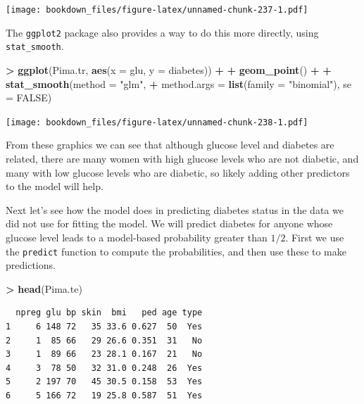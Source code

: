 \documentclass[]{krantz}
\makeatletter
\newenvironment{Shaded}{\begin{snugshade}}{\end{snugshade}}
\newcommand{\KeywordTok}[1]{\textcolor[rgb]{0.27,0.27,0.27}{\textbf{#1}}}
\newcommand{\DataTypeTok}[1]{\textcolor[rgb]{0.27,0.27,0.27}{#1}}
\newcommand{\StringTok}[1]{\textcolor[rgb]{0.5,0.5,0.5}{#1}}
\newcommand{\OtherTok}[1]{\textcolor[rgb]{0.37,0.37,0.37}{#1}}
\newcommand{\OperatorTok}[1]{\textcolor[rgb]{0.43,0.43,0.43}{\textbf{#1}}}
\newcommand{\NormalTok}[1]{#1}
\newenvironment{kframe}{%
\medskip{}
\setlength{\fboxsep}{.8em}
 \def\at@end@of@kframe{}%
 \ifinner\ifhmode%
  \def\at@end@of@kframe{\end{minipage}}%
  \begin{minipage}{\columnwidth}%
 \fi\fi%
 \def\FrameCommand##1{\hskip\@totalleftmargin \hskip-\fboxsep
 \colorbox{shadecolor}{##1}\hskip-\fboxsep
     \hskip-\linewidth \hskip-\@totalleftmargin \hskip\columnwidth}%
 \MakeFramed {\advance\hsize-\width
   \@totalleftmargin\z@ \linewidth\hsize
   \@setminipage}}%
 {\par\unskip\endMakeFramed%
 \at@end@of@kframe}
\renewenvironment{Shaded}{\begin{kframe}}{\end{kframe}}
\makeatother
\begin{document}
\texttt{[image: bookdown\_files/figure-latex/unnamed-chunk-237-1.pdf]}

The \texttt{ggplot2} package also provides a way to do this more
directly, using \texttt{stat\_smooth}.

\begin{Shaded}
\begin{Highlighting}[]
\OperatorTok{>}\StringTok{ }\KeywordTok{ggplot}\NormalTok{(Pima.tr, }\KeywordTok{aes}\NormalTok{(}\DataTypeTok{x =}\NormalTok{ glu, }\DataTypeTok{y =}\NormalTok{ diabetes)) }\OperatorTok{+}\StringTok{ }
\OperatorTok{+}\StringTok{   }\KeywordTok{geom_point}\NormalTok{() }\OperatorTok{+}\StringTok{ }
\OperatorTok{+}\StringTok{   }\KeywordTok{stat_smooth}\NormalTok{(}\DataTypeTok{method =} \StringTok{"glm"}\NormalTok{, }
\OperatorTok{+}\StringTok{               }\DataTypeTok{method.args =} \KeywordTok{list}\NormalTok{(}\DataTypeTok{family =} \StringTok{"binomial"}\NormalTok{), }\DataTypeTok{se =} \OtherTok{FALSE}\NormalTok{)}
\end{Highlighting}
\end{Shaded}

\texttt{[image: bookdown\_files/figure-latex/unnamed-chunk-238-1.pdf]}

From these graphics we can see that although glucose level and diabetes
are related, there are many women with high glucose levels who are not
diabetic, and many with low glucose levels who are diabetic, so likely
adding other predictors to the model will help.

Next let's see how the model does in predicting diabetes status in the
data we did not use for fitting the model. We will predict diabetes for
anyone whose glucose level leads to a model-based probability greater
than \(1/2\). First we use the \texttt{predict} function to compute the
probabilities, and then use these to make predictions.

\begin{Shaded}
\begin{Highlighting}[]
\OperatorTok{>}\StringTok{ }\KeywordTok{head}\NormalTok{(Pima.te)}
\end{Highlighting}
\end{Shaded}

\begin{verbatim}
  npreg glu bp skin  bmi   ped age type
1     6 148 72   35 33.6 0.627  50  Yes
2     1  85 66   29 26.6 0.351  31   No
3     1  89 66   23 28.1 0.167  21   No
4     3  78 50   32 31.0 0.248  26  Yes
5     2 197 70   45 30.5 0.158  53  Yes
6     5 166 72   19 25.8 0.587  51  Yes
\end{verbatim}
\end{document}
